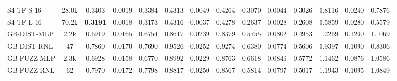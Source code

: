 \begin{table*}[h]
{\begin{tabular}{l c >{\columncolor{gray!20}}ccc >{\columncolor{gray!20}}ccc >{\columncolor{gray!20}}ccc >{\columncolor{gray!20}}ccc}
            \hline
            S4-TF-S-16 & 28.0k & 0.3403 & 0.0019 & 0.3384 & 0.4313 & 0.0049 & 0.4264 & 0.3070 & 0.0044 & 0.3026 & 0.8116 & 0.0240 & 0.7876 \\
            S4-TF-L-16 & 70.2k & \textbf{0.3191} & 0.0018 & 0.3173 & 0.4316 & 0.0037 & 0.4278 & 0.2637 & 0.0028 & 0.2608 & 0.5859 & 0.0280 & 0.5579 \\
            \hline
            GB-DIST-MLP & 2.2k & 0.6919 & 0.0165 & 0.6754 & 0.8617 & 0.0239 & 0.8379 & 0.5755 & 0.0802 & 0.4953 & 1.2269 & 0.1200 & 1.1069 \\
            GB-DIST-RNL & 47 & 0.7860 & 0.0170 & 0.7690 & 0.9526 & 0.0252 & 0.9274 & 0.6380 & 0.0774 & 0.5606 & 0.9397 & 0.1090 & 0.8306 \\
            \hline
            GB-FUZZ-MLP & 2.3k & 0.6928 & 0.0158 & 0.6770 & 0.8992 & 0.0229 & 0.8763 & 0.6618 & 0.0846 & 0.5772 & 1.1462 & 0.0876 & 1.0586 \\
            GB-FUZZ-RNL & 62 & 0.7970 & 0.0172 & 0.7798 & 0.8817 & 0.0250 & 0.8567 & 0.5814 & 0.0797 & 0.5017 & 1.1943 & 0.1095 & 1.0849 \\
            \hline
            \hline
        \end{tabular}
    }
\end{table*}

